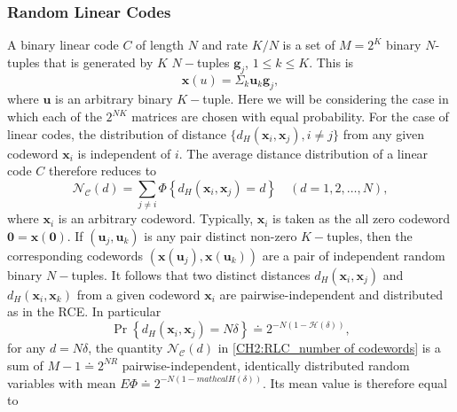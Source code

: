 \subsubsection{Random Linear Codes}
A binary linear code $C$ of length $N$ and rate $K/N$ is a set of $M=2^K$ binary $N$-tuples that is generated by $K$ $N-$tuples $\mathbf{g}_j$, $1\leq k \leq K$. This is
\begin{equation}
\mathbf{x}(u)=\Sigma_k \mathbf{u}_k \mathbf{g}_j,
\end{equation}
where $\mathbf{u}$ is an arbitrary binary $K-$tuple. Here we will be considering the case in which each of the $2^{NK}$ matrices are chosen with equal probability. For the case of linear codes, the distribution of distance $\{d_H(\mathbf{x}_i,\mathbf{x}_j),i\neq j\}$ from any given codeword $\mathbf{x}_i$ is independent of $i$. The average distance distribution of a linear code $C$ therefore reduces to
\begin{equation}
\mathcal{N}_{\mathcal{C}}(d)=\sum_{j \neq i} \Phi\left\{d_{H}\left(\boldsymbol{x}_{i}, \boldsymbol{x}_{j}\right)=d\right\} \quad(d=1,2, \ldots, N),
\label{CH2:RLC_number of codewords}
\end{equation}
where $\mathbf{x}_i$ is an arbitrary codeword. Typically, $\mathbf{x}_i$ is taken as the all zero codeword $\mathbf{0}=\mathbf{x(0)}$. If $(\mathbf{u}_j,\mathbf{u}_k)$ is any pair distinct non-zero $K-$tuples, then the corresponding codewords $(\mathbf{x}(\mathbf{u}_j),\mathbf{x}(\mathbf{u}_k))$ are a pair of independent random binary $N-$tuples. It follows that two distinct distances $d_H(\mathbf{x}_i,\mathbf{x}_j)$ and $d_H(\mathbf{x}_i,\mathbf{x}_k)$ from a given codeword $\mathbf{x}_i$ are pairwise-independent and distributed as in the RCE. In particular 
\begin{equation}
\operatorname{Pr}\left\{d_{H}\left(\boldsymbol{x}_{i}, \boldsymbol{x}_{j}\right)=N \delta\right\} \doteq 2^{-N(1-\mathcal{H}(\delta))},
\end{equation}
for any $d=N\delta$, the quantity $\mathcal{N}_{\mathcal{C}}(d)$ in \eqref{CH2:RLC_number of codewords} is a sum of $M-1\doteq 2^{NR}$ pairwise-independent, identically distributed random variables with mean $E\Phi\doteq 2^{-N(1-mathcal{H}(\delta))}$. Its mean value is therefore equal to

